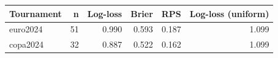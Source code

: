 \begin{tabular}{lrrrrr}
\toprule
Tournament & n & Log-loss & Brier & RPS & Log-loss (uniform) \\
\midrule
euro2024 & 51 & 0.990 & 0.593 & 0.187 & 1.099 \\
copa2024 & 32 & 0.887 & 0.522 & 0.162 & 1.099 \\
\bottomrule
\end{tabular}

